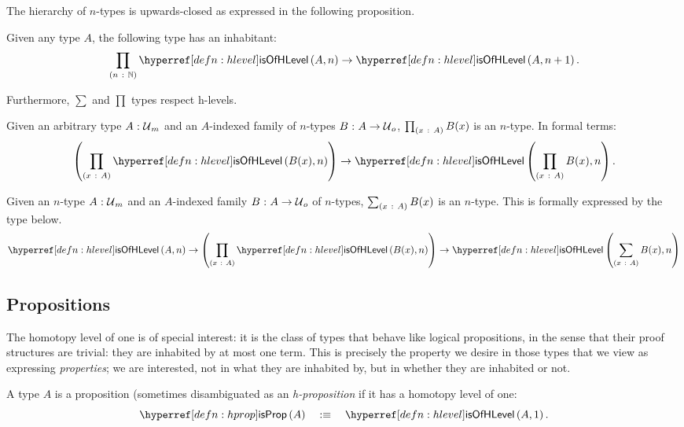 The hierarchy of $n$-types is upwards-closed as expressed in the following proposition.
\begin{prop}\label{prop:level-up}
  Given any type $A$, the following type has an inhabitant:
  \begin{equation*}
    \pity{n}{\mathbb{N}}{\isofhlevel{A}{n} \rightarrow \isofhlevel{A}{n+1}}.
  \end{equation*}
\end{prop}

Furthermore, $\sum$ and $\prod$ types respect h-levels.
\begin{prop}\label{prop:is-of-level-pi}
  Given an arbitrary type $A\hspace{0.1mm}:\hspace{0.1mm}\mathcal{U}{}_m$ and an $A$-indexed family of $n$-types
  $B\hspace{0.1mm}:\hspace{0.1mm}A \rightarrow \mathcal{U}{}_o$, $\prod_{(x~:~A)} B(x)$ is an $n$-type. In formal
  terms:
  \begin{equation*}
    \left( \pity{x}{A}{\isofhlevel{B(x)}{n}} \right)
      \rightarrow \isofhlevel{\pity{x}{A}{B(x)}}{n}.
  \end{equation*}
\end{prop}

\begin{prop}\label{prop:is-of-level-sigma}
  Given an $n$-type $A\hspace{0.1mm}:\hspace{0.1mm}\mathcal{U}{}_m$ and an $A$-indexed family
  $B\hspace{0.1mm}:\hspace{0.1mm}A \rightarrow \mathcal{U}{}_o$ of $n$-types, $\sum_{(x~:~A)} B(x)$ is an $n$-type.
  This is formally expressed by the type below.
  \begin{equation*}
      \isofhlevel{A}{n}
    \rightarrow \left( \pity{x}{A}{\isofhlevel{B(x)}{n}} \right)
    \rightarrow \isofhlevel{\sigmaty{x}{A}{B(x)}}{n}
  \end{equation*}
\end{prop}

\subsection{Propositions}\label{subsec:prop}

The homotopy level of one is of special interest: it is the class of types that behave
like logical propositions, in the sense that their proof structures are trivial: they are
inhabited by at most one term. This is precisely the property we desire in those types
that we view as expressing \emph{properties}; we are interested, not in what they are
inhabited by, but in whether they are inhabited or not.

\begin{defn}[Proposition]\label{defn:prop'}
  A type $A$ is a proposition (sometimes disambiguated as an \emph{h-proposition} if it
  has a homotopy level of one:
  \begin{equation*}
    \isprop{A} \quad\is\quad \isofhlevel{A}{1}.
  \end{equation*}
\end{defn}

